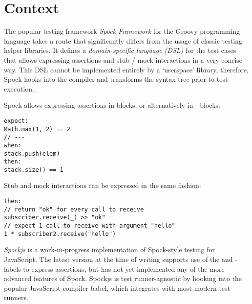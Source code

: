 \section{Context}
The popular testing framework \textit{Spock Framework}
for the Groovy programming language takes a route
that significantly differs from the usage of
classic testing helper libraries.
It defines a \textit{domain-specific language (DSL)} for the test cases
that allows expressing assertions and stub / mock interactions in a very concise way.
This DSL cannot be implemented entirely by a `userspace' library, therefore,
Spock hooks into the compiler and transforms the syntax tree prior to test execution.

Spock allows expressing assertions in  blocks,
or alternatively in - blocks:
\autocite{SpockFrameworkDoc}
\begin{verbatim}
expect:
Math.max(1, 2) == 2
// ---
when:
stack.push(elem)
then:
stack.size() == 1
\end{verbatim}
Stub and mock interactions can be expressed in the same fashion:
\autocite{SpockFrameworkDoc}
\begin{verbatim}
then:
// return "ok" for every call to receive
subscriber.receive(_) >> "ok"
// expect 1 call to receive with argument "hello"
1 * subscriber2.receive("hello")
\end{verbatim}

\textit{Spockjs} is a work-in-progress implementation
of Spock-style testing for JavaScript.
\autocite{SpockjsGithub}
The latest version at the time of writing
supports use of the  and -
labels to express assertions,
but has not yet implemented any
of the more advanced features of Spock.
Spockjs is test runner-agnostic by
hooking into the popular JavaScript compiler babel,
which integrates with most modern test runners.
\autocite{BabelSetupDoc}
